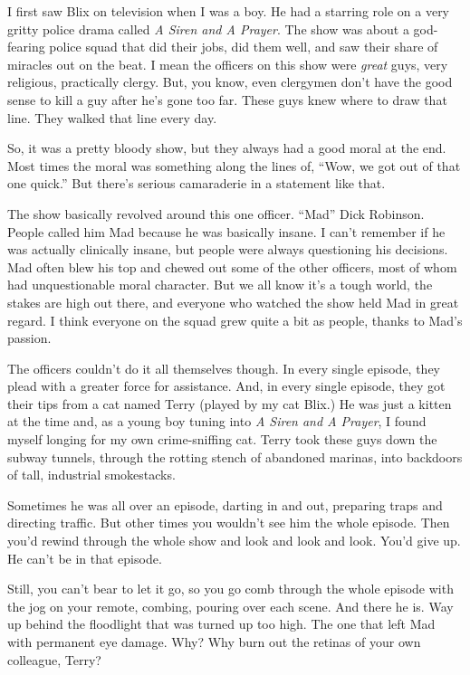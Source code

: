 \documentclass[10pt,twoside]{report}
\begin{document}
I first saw Blix on television when I was a boy.  He had a starring
role on a very gritty police drama called {\em A Siren and A Prayer}.
The show was about a god-fearing police squad that did their jobs, did
them well, and saw their share of miracles out on the beat.  I mean
the officers on this show were {\em great} guys, very religious,
practically clergy.  But, you know, even clergymen don't have the good
sense to kill a guy after he's gone too far. These guys knew where to
draw that line.  They walked that line every day.

So, it was a pretty bloody show, but they always had a good moral at
the end.  Most times the moral was something along the lines of,
``Wow, we got out of that one quick.''  But there's serious
camaraderie in a statement like that.

The show basically revolved around this one officer.  ``Mad'' Dick
Robinson.  People called him Mad because he was basically insane.  I
can't remember if he was actually clinically insane, but people were
always questioning his decisions.  Mad often blew his top and chewed
out some of the other officers, most of whom had unquestionable moral
character.  But we all know it's a tough world, the stakes are high
out there, and everyone who watched the show held Mad in great regard.
I think everyone on the squad grew quite a bit as people, thanks to
Mad's passion.

The officers couldn't do it all themselves though.  In every single
episode, they plead with a greater force for assistance.  And, in
every single episode, they got their tips from a cat named Terry
(played by my cat Blix.)  He was just a kitten at the time and, as a
young boy tuning into {\em A Siren and A Prayer}, I found myself
longing for my own crime-sniffing cat. Terry took these guys down the
subway tunnels, through the rotting stench of abandoned marinas, into
backdoors of tall, industrial smokestacks.

Sometimes he was all over an episode, darting in and out, preparing
traps and directing traffic. But other times you wouldn't see him the
whole episode.  Then you'd rewind through the whole show and look and
look and look.  You'd give up.  He can't be in that episode.

Still, you can't bear to let it go, so you go comb through the whole
episode with the jog on your remote, combing, pouring over each scene.
And there he is.  Way up behind the floodlight that was turned up too
high.  The one that left Mad with permanent eye damage.  Why?  Why
burn out the retinas of your own colleague, Terry?
\end{document}
